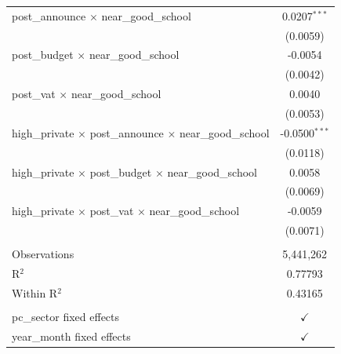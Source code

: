 \begin{table}[htbp]
\begin{tabular}{lc}
      post\_announce $\times$ near\_good\_school                              & 0.0207$^{***}$\\   
                                                                              & (0.0059)\\   
      post\_budget $\times$ near\_good\_school                                & -0.0054\\   
                                                                              & (0.0042)\\   
      post\_vat $\times$ near\_good\_school                                   & 0.0040\\   
                                                                              & (0.0053)\\   
      high\_private $\times$ post\_announce $\times$ near\_good\_school       & -0.0500$^{***}$\\   
                                                                              & (0.0118)\\   
      high\_private $\times$ post\_budget $\times$ near\_good\_school         & 0.0058\\   
                                                                              & (0.0069)\\   
      high\_private $\times$ post\_vat $\times$ near\_good\_school            & -0.0059\\   
                                                                              & (0.0071)\\   
       \\
      Observations                                                            & 5,441,262\\  
      R$^2$                                                                   & 0.77793\\  
      Within R$^2$                                                            & 0.43165\\  
       \\
      pc\_sector fixed effects                                                & $\checkmark$\\   
      year\_month fixed effects                                               & $\checkmark$\\   
      \bottomrule
   \end{tabular}
\end{table}


